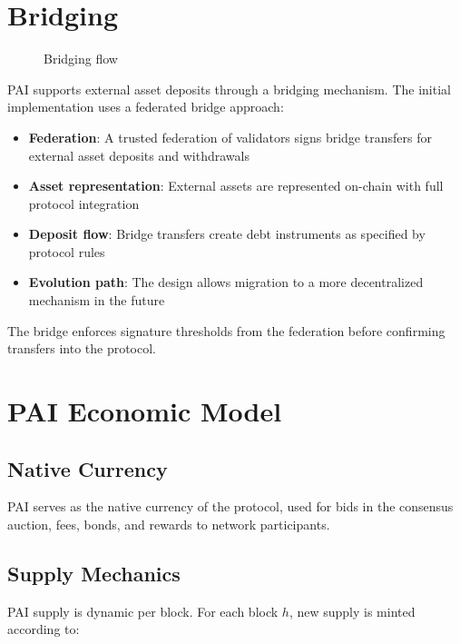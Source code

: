 \documentclass[11pt,a4paper]{article}
\begin{document}
\section{Bridging}
\begin{figure}[H]
\centering
{}
\caption{Bridging flow}
\label{fig:bridge}
\end{figure}

PAI supports external asset deposits through a bridging mechanism. The initial implementation uses a federated bridge approach:

\begin{itemize}
\item \textbf{Federation}: A trusted federation of validators signs bridge transfers for external asset deposits and withdrawals
\item \textbf{Asset representation}: External assets are represented on-chain with full protocol integration
\item \textbf{Deposit flow}: Bridge transfers create debt instruments as specified by protocol rules
\item \textbf{Evolution path}: The design allows migration to a more decentralized mechanism in the future
\end{itemize}

The bridge enforces signature thresholds from the federation before confirming transfers into the protocol.

\section{PAI Economic Model}
\subsection{Native Currency}
PAI serves as the native currency of the protocol, used for bids in the consensus auction, fees, bonds, and rewards to network participants.

\subsection{Supply Mechanics}
PAI supply is dynamic per block. For each block $h$, new supply is minted according to:
\end{document}

